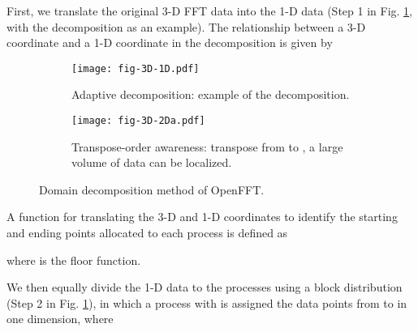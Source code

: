 First, we translate the original 3-D FFT data  into the 1-D data  (Step 1 in Fig. \ref{fig-3D-1D}, with the  decomposition as an example). 
The relationship between a 3-D coordinate  and a 1-D coordinate  in the  decomposition is given by



\begin{figure}
        \centering
        \begin{subfigure}{\textwidth}
                \texttt{[image: fig-3D-1D.pdf]}
                \caption{Adaptive decomposition: example of the  decomposition.}
                \label{fig-3D-1D}
        \end{subfigure}

        \begin{subfigure}{\textwidth}
                \texttt{[image: fig-3D-2Da.pdf]}
                \caption{Transpose-order awareness: transpose from  to , a large volume of data can be localized.}
                \label{fig-3D-2Da}
        \end{subfigure}
        \caption{Domain decomposition method of OpenFFT.}\label{fig-domain-openfft}
\end{figure}

\begin{comment}

\begin{figure}[htbp]
\begin{center}
\subfigure[Adaptive decomposition: example of the  decomposition.]{\label{fig-3D-1D}
\texttt{[image: fig-3D-1D.pdf]}}
\subfigure[Transpose-order awareness: transpose from  to , a large volume of data can be localized.]{\label{fig-3D-2Da}
\texttt{[image: fig-3D-2Da.pdf]}}
\end{center}
\caption{Domain decomposition method of OpenFFT.}
\label{fig-domain-openfft}
\end{figure}

\end{comment}


A function  for translating the 3-D and 1-D coordinates to identify the starting and ending points allocated to each process is defined as    

where  is the floor function. 

We then equally divide the 1-D data to the processes using a block distribution (Step 2 in Fig. \ref{fig-3D-1D}), in which a process with  is assigned the data points from  to  in one dimension, where



